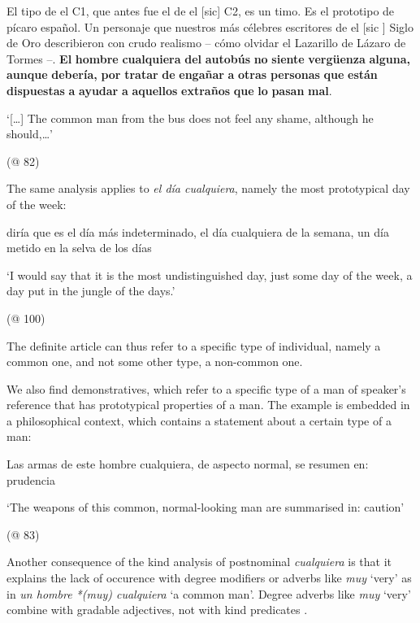 \documentclass[output=paper]{langscibook}
\begin{document}
\label{bkm:Ref63545986}  El tipo de el C1, que antes fue el de el [sic] C2, es un timo. Es el prototipo de pícaro español. Un personaje que nuestros más célebres escritores de el [sic ] Siglo de Oro describieron con crudo realismo – cómo olvidar el Lazarillo de Lázaro de Tormes –. \textbf{El} \textbf{hombre} \textbf{cualquiera} \textbf{del} \textbf{autobús} \textbf{no} \textbf{siente} \textbf{vergüenza} \textbf{alguna,} \textbf{aunque} \textbf{debería,} \textbf{por} \textbf{tratar} \textbf{de} \textbf{engañar} \textbf{a} \textbf{otras} \textbf{personas} \textbf{que} \textbf{están} \textbf{dispuestas} \textbf{a} \textbf{ayudar} \textbf{a} \textbf{aquellos} \textbf{extraños} \textbf{que} \textbf{lo} \textbf{pasan} \textbf{mal}.

  ‘[…] The common man from the bus does not feel any shame, although he should,…’

  (@ 82)

The same analysis applies to \textit{el día cualquiera}, namely the most prototypical day of the week:

  diría que es el día más indeterminado, el día cualquiera de la semana, un día metido en la selva de los días

  ‘I would say that it is the most undistinguished day, just some day of the week, a day put in the jungle of the days.’

  (@ 100)

The definite article can thus refer to a specific type of individual, namely a common one, and not some other type, a non-common one. 

  We also find demonstratives, which refer to a specific type of a man of speaker’s reference that has prototypical properties of a man. The example is embedded in a philosophical context, which contains a statement about a certain type of a man:

\label{bkm:Ref63545989}  Las armas de este hombre cualquiera, de aspecto normal, se resumen en: prudencia

  ‘The weapons of this common, normal-looking man are summarised in: caution’

  (@ 83)

Another consequence of the kind analysis of postnominal \textit{cualquiera} is that it explains the lack of occurence with degree modifiers or adverbs like \textit{muy} ‘very’ as in \textit{un hombre *(muy) cualquiera} ‘a common man’. Degree adverbs like \textit{muy} ‘very’ combine with gradable adjectives, not with kind predicates \citep{Kennedy1999}. 
\end{document}
